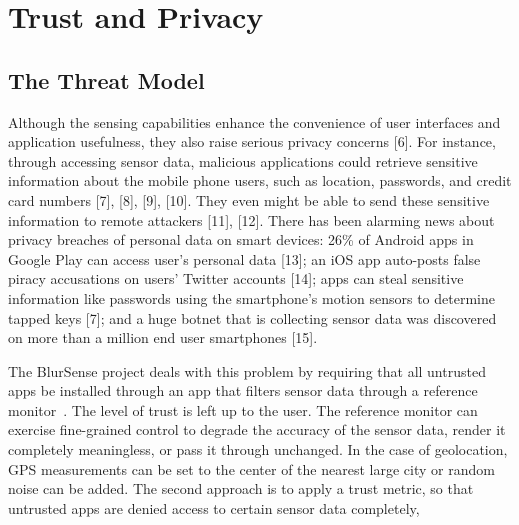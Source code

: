 \section{Trust and Privacy}
\label{sec:blursense}

\subsection{The Threat Model}
Although the sensing capabilities
enhance the convenience of user interfaces and application
usefulness, they also raise serious privacy concerns [6]. For
instance, through accessing sensor data, malicious applications
could retrieve sensitive information about the mobile phone
users, such as location, passwords, and credit card numbers [7],
[8], [9], [10]. They even might be able to send these sensitive
information to remote attackers [11], [12]. 
There has been
alarming news about privacy breaches of personal data on
smart devices: 26\% of Android apps in Google Play can access
user's personal data [13]; an iOS app auto-posts false piracy
accusations on users' Twitter accounts [14]; apps can steal
sensitive information like passwords using the smartphone's
motion sensors to determine tapped keys [7]; and a huge
botnet that is collecting sensor data was discovered on more
than a million end user smartphones [15]. 

The BlurSense project deals with this problem by requiring that all untrusted apps be installed
through an app that filters sensor data through a reference monitor~\cite{cappos-SAS}.  
The level of trust is left up to the user.  The reference
monitor can exercise fine-grained control to degrade the accuracy of the sensor data, render it 
completely meaningless, or pass it through unchanged.  
In the case of geolocation, GPS measurements can be set to the center of the nearest
large city or random noise can be added.  
The second approach is to apply a trust metric, so that untrusted apps are denied access to certain
sensor data completely,

